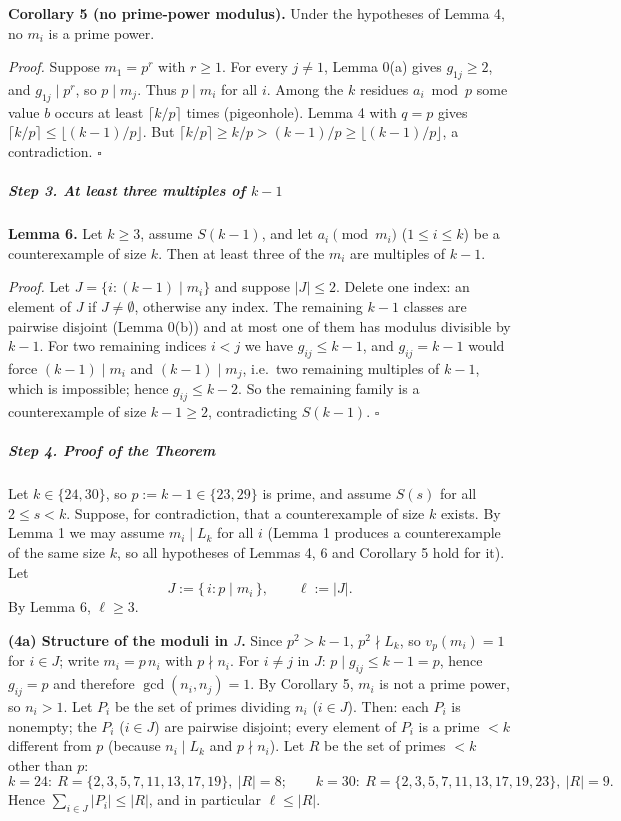 \documentclass[11pt,a4paper]{article}
\begin{document}
\textbf{Corollary 5 (no prime-power modulus).} Under the hypotheses of
Lemma 4, no \(m_i\) is a prime power.

\emph{Proof.} Suppose \(m_1=p^r\) with \(r\ge1\). For every \(j\ne1\),
Lemma 0(a) gives \(g_{1j}\ge2\), and \(g_{1j}\mid p^r\), so
\(p\mid m_j\). Thus \(p\mid m_i\) for all \(i\). Among the \(k\)
residues \(a_i\bmod p\) some value \(b\) occurs at least
\(\lceil k/p\rceil\) times (pigeonhole). Lemma 4 with \(q=p\) gives
\(\lceil k/p\rceil\le\lfloor (k-1)/p\rfloor\). But
\(\lceil k/p\rceil\ge k/p>(k-1)/p\ge\lfloor (k-1)/p\rfloor\), a
contradiction. \(\square\)

\subparagraph{\texorpdfstring{Step 3. At least three multiples of
\(k-1\)}{Step 3. At least three multiples of k-1}}\label{step-3.-at-least-three-multiples-of-k-1}

\textbf{Lemma 6.} Let \(k\ge3\), assume \(S(k-1)\), and let
\(a_i\pmod{m_i}\) (\(1\le i\le k\)) be a counterexample of size \(k\).
Then at least three of the \(m_i\) are multiples of \(k-1\).

\emph{Proof.} Let \(J=\{i:(k-1)\mid m_i\}\) and suppose \(|J|\le2\).
Delete one index: an element of \(J\) if \(J\ne\emptyset\), otherwise
any index. The remaining \(k-1\) classes are pairwise disjoint (Lemma
0(b)) and at most one of them has modulus divisible by \(k-1\). For two
remaining indices \(i<j\) we have \(g_{ij}\le k-1\), and \(g_{ij}=k-1\)
would force \((k-1)\mid m_i\) and \((k-1)\mid m_j\), i.e.~two remaining
multiples of \(k-1\), which is impossible; hence \(g_{ij}\le k-2\). So
the remaining family is a counterexample of size \(k-1\ge2\),
contradicting \(S(k-1)\). \(\square\)

\subparagraph{Step 4. Proof of the
Theorem}\label{step-4.-proof-of-the-theorem}

Let \(k\in\{24,30\}\), so \(p:=k-1\in\{23,29\}\) is prime, and assume
\(S(s)\) for all \(2\le s<k\). Suppose, for contradiction, that a
counterexample of size \(k\) exists. By Lemma 1 we may assume
\(m_i\mid L_k\) for all \(i\) (Lemma 1 produces a counterexample of the
same size \(k\), so all hypotheses of Lemmas 4, 6 and Corollary 5 hold
for it). Let \[J:=\{\,i: p\mid m_i\,\},\qquad \ell:=|J|.\] By Lemma 6,
\(\ell\ge3\).

\textbf{(4a) Structure of the moduli in \(J\).} Since \(p^2>k-1\),
\(p^2\nmid L_k\), so \(v_p(m_i)=1\) for \(i\in J\); write \(m_i=p\,n_i\)
with \(p\nmid n_i\). For \(i\ne j\) in \(J\): \(p\mid g_{ij}\le k-1=p\),
hence \(g_{ij}=p\) and therefore \(\gcd(n_i,n_j)=1\). By Corollary 5,
\(m_i\) is not a prime power, so \(n_i>1\). Let \(P_i\) be the set of
primes dividing \(n_i\) (\(i\in J\)). Then: each \(P_i\) is nonempty;
the \(P_i\) (\(i\in J\)) are pairwise disjoint; every element of \(P_i\)
is a prime \(<k\) different from \(p\) (because \(n_i\mid L_k\) and
\(p\nmid n_i\)). Let \(R\) be the set of primes \(<k\) other than \(p\):
\[k=24:\ R=\{2,3,5,7,11,13,17,19\},\ |R|=8;\qquad k=30:\ R=\{2,3,5,7,11,13,17,19,23\},\ |R|=9 .\]
Hence \(\sum_{i\in J}|P_i|\le|R|\), and in particular \(\ell\le|R|\).
\end{document}
